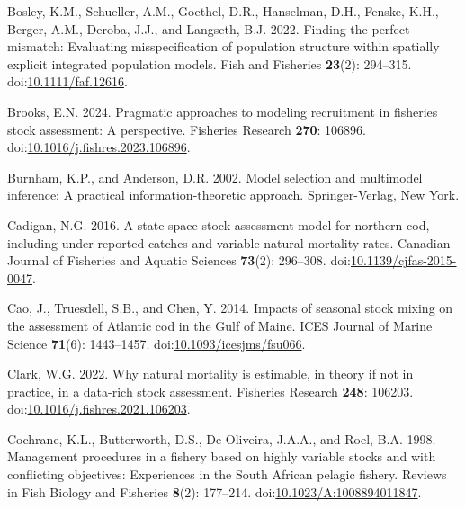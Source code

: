 \documentclass[
]{article}
\newlength{\cslhangindent}
\newlength{\cslentryspacingunit} %
\newenvironment{CSLReferences}[2] %
 {%
  \setlength{\parindent}{0pt}
  \ifodd #1
  \let\oldpar\par
  \def\par{\hangindent=\cslhangindent\oldpar}
  \fi
  \setlength{\parskip}{#2\cslentryspacingunit}
 }%
 {}
\begin{document}
\begin{CSLReferences}{1}{0}
\leavevmode{}%
Bosley, K.M., Schueller, A.M., Goethel, D.R., Hanselman, D.H., Fenske, K.H., Berger, A.M., Deroba, J.J., and Langseth, B.J. 2022. Finding the perfect mismatch: Evaluating misspecification of population structure within spatially explicit integrated population models. Fish and Fisheries \textbf{23}(2): 294--315. doi:\href{https://doi.org/10.1111/faf.12616}{10.1111/faf.12616}.

\leavevmode{}%
Brooks, E.N. 2024. Pragmatic approaches to modeling recruitment in fisheries stock assessment: A perspective. Fisheries Research \textbf{270}: 106896. doi:\href{https://doi.org/10.1016/j.fishres.2023.106896}{10.1016/j.fishres.2023.106896}.

\leavevmode{}%
Burnham, K.P., and Anderson, D.R. 2002. Model selection and multimodel inference: A practical information-theoretic approach. Springer-Verlag, New York.

\leavevmode{}%
Cadigan, N.G. 2016. A state-space stock assessment model for northern cod, including under-reported catches and variable natural mortality rates. Canadian Journal of Fisheries and Aquatic Sciences \textbf{73}(2): 296--308. doi:\href{https://doi.org/10.1139/cjfas-2015-0047}{10.1139/cjfas-2015-0047}.

\leavevmode{}%
Cao, J., Truesdell, S.B., and Chen, Y. 2014. Impacts of seasonal stock mixing on the assessment of {A}tlantic cod in the {G}ulf of {M}aine. ICES Journal of Marine Science \textbf{71}(6): 1443--1457. doi:\href{https://doi.org/10.1093/icesjms/fsu066}{10.1093/icesjms/fsu066}.

\leavevmode{}%
Clark, W.G. 2022. Why natural mortality is estimable, in theory if not in practice, in a data-rich stock assessment. Fisheries Research \textbf{248}: 106203. doi:\href{https://doi.org/10.1016/j.fishres.2021.106203}{10.1016/j.fishres.2021.106203}.

\leavevmode{}%
Cochrane, K.L., Butterworth, D.S., De Oliveira, J.A.A., and Roel, B.A. 1998. Management procedures in a fishery based on highly variable stocks and with conflicting objectives: Experiences in the {S}outh {A}frican pelagic fishery. Reviews in Fish Biology and Fisheries \textbf{8}(2): 177--214. doi:\href{https://doi.org/10.1023/A:1008894011847}{10.1023/A:1008894011847}.


\end{CSLReferences}
\end{document}
